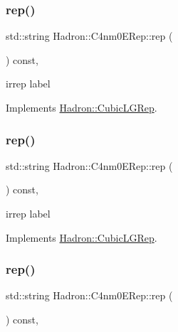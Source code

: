 \subsubsection{\texorpdfstring{rep()}{rep()}\hspace{0.1cm}{\footnotesize\ttfamily [1/3]}}
{\footnotesize\ttfamily std\+::string Hadron\+::\+C4nm0\+E\+Rep\+::rep (\begin{DoxyParamCaption}{ }\end{DoxyParamCaption}) const\hspace{0.3cm}{\ttfamily [inline]}, {\ttfamily [virtual]}}

irrep label 

Implements \mbox{\hyperlink{structHadron_1_1CubicLGRep_a50f5ddbb8f4be4cee0106fa9e8c75e6c}{Hadron\+::\+Cubic\+L\+G\+Rep}}.

\mbox{\label{structHadron_1_1C4nm0ERep_a7f4628e8d080d5552176c65fcbd66e84}} 
\subsubsection{\texorpdfstring{rep()}{rep()}\hspace{0.1cm}{\footnotesize\ttfamily [2/3]}}
{\footnotesize\ttfamily std\+::string Hadron\+::\+C4nm0\+E\+Rep\+::rep (\begin{DoxyParamCaption}{ }\end{DoxyParamCaption}) const\hspace{0.3cm}{\ttfamily [inline]}, {\ttfamily [virtual]}}

irrep label 

Implements \mbox{\hyperlink{structHadron_1_1CubicLGRep_a50f5ddbb8f4be4cee0106fa9e8c75e6c}{Hadron\+::\+Cubic\+L\+G\+Rep}}.

\mbox{\label{structHadron_1_1C4nm0ERep_a7f4628e8d080d5552176c65fcbd66e84}} 
\subsubsection{\texorpdfstring{rep()}{rep()}\hspace{0.1cm}{\footnotesize\ttfamily [3/3]}}
{\footnotesize\ttfamily std\+::string Hadron\+::\+C4nm0\+E\+Rep\+::rep (\begin{DoxyParamCaption}{ }\end{DoxyParamCaption}) const\hspace{0.3cm}{\ttfamily [inline]}, {\ttfamily [virtual]}}

